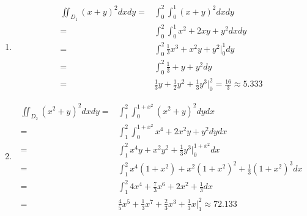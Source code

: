 \documentclass[a4paper,12pt]{article}
\begin{document}
\begin{enumerate}
\begin{enumerate}
		\item \begin{equation*}
		\begin{aligned}
		\iint_{D_1} (x+y)^2 dx dy =& \int_{0}^{2} \int_{0}^{1} (x+y)^2 dx dy\\
		=& \int_{0}^{2} \int_{0}^{1} x^2 + 2xy + y^2 dx dy\\
		=& \int_{0}^{2} \frac{1}{3}x^3 + x^2y + y^2 \Biggr|_0^1 dy\\
		=& \int_{0}^{2} \frac{1}{3} + y + y^2 dy\\
		=& \frac{1}{3}y + \frac{1}{2}y^2 + \frac{1}{3}y^3 \Biggr|_0^2 = \frac{16}{3} \approx 5.333
		\end{aligned}
		\end{equation*}
		
		\item \begin{equation*}
		\begin{aligned}
		\iint_{D_2} (x^2+y)^2 dx dy =& \int_{1}^{2} \int_{0}^{1+x^2} (x^2+y)^2 dy dx\\
		=& \int_{1}^{2} \int_{0}^{1+x^2} x^4 + 2x^2y + y^2 dy dx\\
		=& \int_{1}^{2} x^4y + x^2y^2 + \frac{1}{3}y^3 \Biggr|_0^{1+x^2} dx\\
		=& \int_{1}^{2} x^4(1+x^2) + x^2(1+x^2)^2 + \frac{1}{3}(1+x^2)^3 dx\\
		=& \int_{1}^{2} 4x^4 + \frac{7}{3} x^6 + 2x^2 + \frac{1}{3} dx\\
		=& \frac{4}{5}x^5 + \frac{1}{3}x^7 + \frac{2}{3}x^3 + \frac{1}{3}x \Biggr|_1^2 \approx 72.133
		\end{aligned}
		\end{equation*}
	\end{enumerate}


\end{enumerate}
\end{document}
